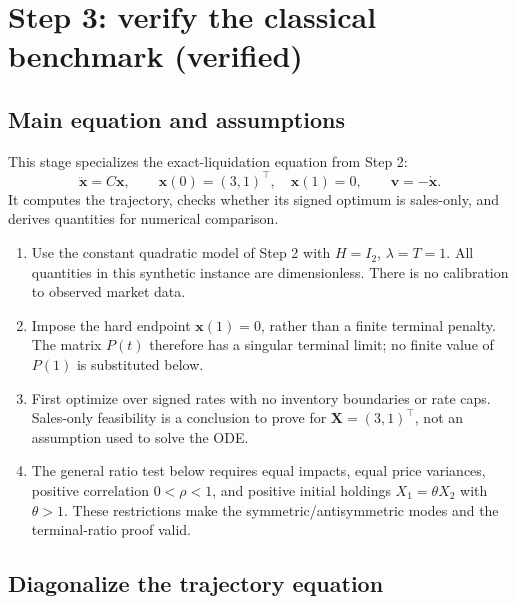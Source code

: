 \section{Step 3: verify the classical benchmark (verified)}
\label{sec:stage3}

\subsection*{Main equation and assumptions}

This stage specializes the exact-liquidation equation from Step 2:
\[
 \boxed{\ddot{\mathbf x}=C\mathbf x,\qquad
 \mathbf x(0)=(3,1)^\top,\quad\mathbf x(1)=0,\qquad
 \mathbf v=-\dot{\mathbf x}.}
\]
It computes the trajectory, checks whether its signed optimum is
sales-only, and derives quantities for numerical comparison.

\begin{enumerate}
\item Use the constant quadratic model of Step 2 with $H=I_2$,
$\lambda=T=1$. All quantities in this synthetic instance are
dimensionless. There is no calibration to observed market data.
\item Impose the hard endpoint $\mathbf x(1)=0$, rather than a finite
terminal penalty. The matrix $P(t)$ therefore has a singular terminal
limit; no finite value of $P(1)$ is substituted below.
\item First optimize over signed rates with no inventory boundaries or
rate caps. Sales-only feasibility is a conclusion to prove for
$\mathbf X=(3,1)^\top$, not an assumption used to solve the ODE.
\item The general ratio test below requires equal impacts, equal price
variances, positive correlation $0<\rho<1$, and positive initial holdings
$X_1=\theta X_2$ with $\theta>1$. These restrictions make the
symmetric/antisymmetric modes and the terminal-ratio proof valid.
\end{enumerate}

\subsection*{Diagonalize the trajectory equation}

